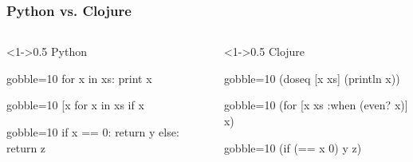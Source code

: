 \documentclass{beamer}
\begin{document}
\begin{frame}[fragile, t]
  \frametitle{Python vs. Clojure}
  \begin{columns}[T]
    \begin{column}<1->{0.5\textwidth}
      Python
      \begin{overprint}
        \begin{pycode*}{gobble=10}
          for x in xs:
              print x
        \end{pycode*}
      \end{overprint}
      \begin{overprint}
        \begin{pycode*}{gobble=10}
          [x for x in xs
                   if x %
        \end{pycode*}
      \end{overprint}
      \begin{overprint}
        \begin{pycode*}{gobble=10}
          if x == 0:
              return y
          else:
              return z
        \end{pycode*}
      \end{overprint}
    \end{column}

    \begin{column}<1->{0.5\textwidth}
      Clojure
      \begin{overprint}
        \begin{cljcode*}{gobble=10}
          (doseq [x xs]
            (println x))
        \end{cljcode*}
      \end{overprint}
      \begin{overprint}
        \begin{cljcode*}{gobble=10}
          (for [x xs
                :when (even? x)] x)
        \end{cljcode*}
      \end{overprint}
      \begin{overprint}
        \begin{cljcode*}{gobble=10}
          (if (== x 0)
            y
            z)
        \end{cljcode*}
      \end{overprint}
    \end{column}
  \end{columns}
\end{frame}
\end{document}

